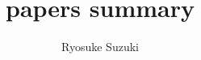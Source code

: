 \documentclass[12pt,fleqn,dvipdfmx]{jarticle}
\begin{document}
  \title{papers summary}
  \author{Ryosuke Suzuki}
  \date{}
  \maketitle
  \tableofcontents
  \newpage


  
  

  
\end{document}

